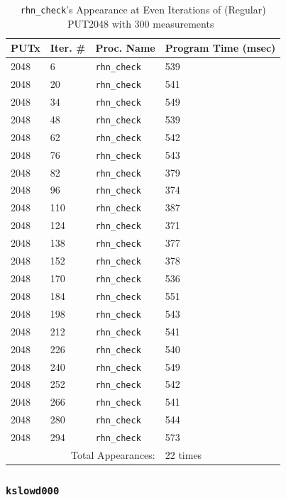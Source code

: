 \documentclass[10pt]{article}
\begin{document}
\begin{table}[htp!]
\centering
{
 \begin{tabular}{|l|l|l|l|} \hline
PUTx & Iter. \# & Proc. Name & Program Time (msec)\\ \hline
2048 & 6 & {\tt rhn\_check} & 539 \\ \hline
2048 & 20 & {\tt rhn\_check} & 541 \\ \hline
2048 & 34 & {\tt rhn\_check} & 549 \\ \hline
2048 & 48 & {\tt rhn\_check} & 539 \\ \hline
2048 & 62 & {\tt rhn\_check} & 542 \\ \hline
2048 & 76 & {\tt rhn\_check} & 543 \\ \hline
2048 & 82 & {\tt rhn\_check} & 379 \\ \hline
2048 & 96 & {\tt rhn\_check} & 374 \\ \hline
2048 & 110 & {\tt rhn\_check} & 387 \\ \hline
2048 & 124 & {\tt rhn\_check} & 371 \\ \hline
2048 & 138 & {\tt rhn\_check} & 377 \\ \hline
2048 & 152 & {\tt rhn\_check} & 378 \\ \hline
2048 & 170 & {\tt rhn\_check} & 536 \\ \hline
2048 & 184 & {\tt rhn\_check} & 551 \\ \hline
2048 & 198 & {\tt rhn\_check} & 543 \\ \hline
2048 & 212 & {\tt rhn\_check} & 541 \\ \hline
2048 & 226 & {\tt rhn\_check} & 540 \\ \hline
2048 & 240 & {\tt rhn\_check} & 549 \\ \hline
2048 & 252 & {\tt rhn\_check} & 542 \\ \hline
2048 & 266 & {\tt rhn\_check} & 541 \\ \hline
2048 & 280 & {\tt rhn\_check} & 544 \\ \hline
2048 & 294 & {\tt rhn\_check} & 573 \\ \hline
\multicolumn{3}{|r|}{Total Appearances:} & 22 times\\ \hline
  \end{tabular}
  }
 \caption{{\tt rhn\_check}'s Appearance at Even Iterations of (Regular) PUT2048 with 300 measurements~\label{fig:rc_reg_put_2048_even}}
\end{table}

\clearpage
\newpage

\subsubsection{{\tt kslowd000}} 
\end{document}
